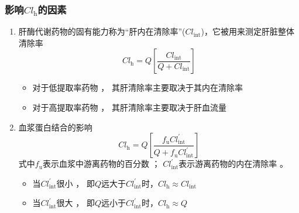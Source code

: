 \documentclass[dvipsnames, svgnames, x11names]{beamer}
\begin{document}
\begin{frame}
    \frametitle{影响$Cl_{\mathrm{h}}$的因素}
    \begin{enumerate}
      \item 肝酶代谢药物的固有能力称为“肝内在清除率”($Cl_{\mathrm{int}}$)，它被用来测定肝脏整体清除率
        \[
          Cl_{\mathrm{h}}=Q\left[\frac{Cl_{\mathrm{int}}}{Q+Cl_{\mathrm{int}}}\right]
        \]
        \begin{itemize}
          \item 对于低提取率药物 ， 其肝清除率主要取决于其内在清除率
          \item 对于高提取率药物 ， 其肝清除率主要取决于肝血流量
        \end{itemize}
      \item 血浆蛋白结合的影响
        \[
          Cl_{\mathrm{h}}=Q\left[\frac{f_{\mathrm{u}}Cl_{\mathrm{int}}^{\prime}}{Q+f_{\mathrm{u}}Cl_{\mathrm{int}}^{\prime}}\right]
        \]
        式中$f_{\mathrm{u}}$表示血浆中游离药物的百分数 ； $Cl_{\mathrm{int}}^{\prime}$表示游离药物的内在清除率 。
          \begin{itemize}
            \item 当$Cl_{\mathrm{int}}^{\prime}$很小 ， 即$Q$远大于$Cl_{\mathrm{int}}^{\prime}$时，$Cl_{\mathrm{h}}\approx Cl_{\mathrm{int}}$
            \item 当$Cl_{\mathrm{int}}^{\prime}$很大 ， 即$Q$远小于$Cl_{\mathrm{int}}^{\prime}$时，$Cl_{\mathrm{h}}\approx Q$
          \end{itemize}
    \end{enumerate}
    
\end{frame}
\end{document}
